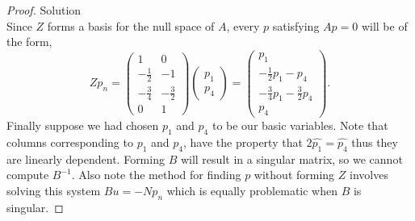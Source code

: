\documentclass[12pt]{article}
\makeatletter
\theoremstyle{homework}
\newenvironment{exercise}[1]
{\def\@currentlabel{#1}\exercisecore}
{\endexercisecore}
\makeatother
\begin{document}
\begin{exercise}{3.3}
\begin{proof}{Solution}
\begin{equation*}
    \end{equation*}
    Since $Z$ forms a basis for the null space of $A$, every $p$ satisfying $Ap = 0$ will be of the form, 
    \begin{equation*}
      Zp_n = \begin{pmatrix}1& 0\\ -\frac{1}{2}&-1\\ -\frac{3}{4}&-\frac{3}{2}\\ 0 & 1\end{pmatrix}
      \begin{pmatrix}
        p_1\\
        p_4
      \end{pmatrix}
       = 
       \begin{pmatrix}
        p_1\\
        -\frac{1}{2}p_1 - p_4\\
        -\frac{3}{4}p_1 - \frac{3}{2}p_4\\
        p_4
       \end{pmatrix}.
    \end{equation*}
    Finally suppose we had chosen $p_1$ and $p_4$ to be our basic variables. Note that columns corresponding 
    to $p_1$ and $p_4$, have the property that $2\hat{p_1} = \hat{p_4}$ thus they are linearly dependent. Forming 
    $B$ will result in a singular matrix, so we cannot compute $B^{-1}$. Also note the method for finding $p$ without 
    forming $Z$ involves solving this system $Bu = -Np_n$ which is equally problematic when $B$ is singular. 
   \end{proof}
\end{exercise}
\vspace{.5in}
\end{document}
